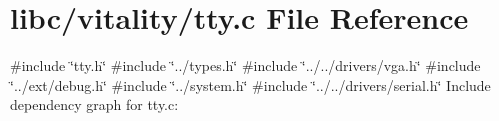 \hypertarget{a00179}{}\section{libc/vitality/tty.c File Reference}
\label{a00179}
{\ttfamily \#include \char`\"{}tty.\+h\char`\"{}}\newline
{\ttfamily \#include \char`\"{}../types.\+h\char`\"{}}\newline
{\ttfamily \#include \char`\"{}../../drivers/vga.\+h\char`\"{}}\newline
{\ttfamily \#include \char`\"{}../ext/debug.\+h\char`\"{}}\newline
{\ttfamily \#include \char`\"{}../system.\+h\char`\"{}}\newline
{\ttfamily \#include \char`\"{}../../drivers/serial.\+h\char`\"{}}\newline
Include dependency graph for tty.\+c\+:
